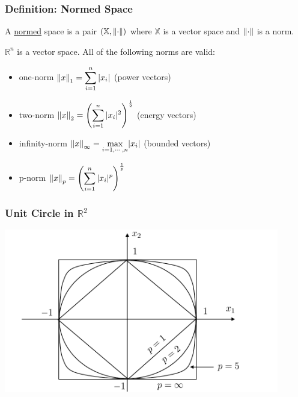 \documentclass{beamer}
\begin{document}
\begin{frame}\frametitle{Definition: Normed Space} 

A \underline{normed} space is a pair $(\mathbb{X},\left\| \cdot\right\| )$ where $\mathbb{X}$ is a vector space and $\left\| \cdot\right\| $ is a norm.

\begin{example}
$\mathbb{R}^n$ is a vector space.  All of the following norms are valid:
\begin{itemize}
  \item one-norm \quad $\left\| x\right\|_1 = \displaystyle \sum_{i=1}^{n}|x_i|$ \quad (power vectors)
  \item two-norm \quad $\left\| x\right\|_2 = \displaystyle \left( \sum_{i=1}^{n}|x_i|^2 \right)^{\frac{1}{2}}$ \quad (energy vectors)
  \item infinity-norm \quad $\left\| x\right\|_{\infty} = \underset{i=1,\cdots,n}{\max}|x_i|$ \quad (bounded vectors)
  \item p-norm \quad $\left\| x\right\|_p = \left( \displaystyle \sum_{i=1}^{n}|x_i|^p \right)^{\frac{1}{p}}$
\end{itemize}
\end{example}
\end{frame}

\begin{frame}\frametitle{Unit Circle in $\mathbb{R}^2$}

\includegraphics[width=0.9\textwidth]{figures/chap2_unit_circle}\\
	
\end{frame}
 
\end{document}
